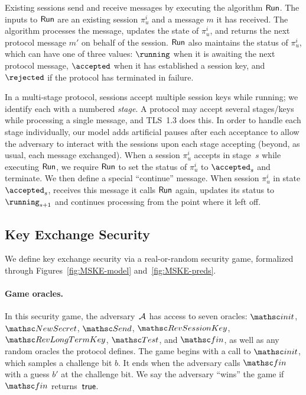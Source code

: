 Existing sessions send and receive messages by executing the algorithm $\mathsf{Run}$.
The inputs to $\mathsf{Run}$ are an existing session $\pi_u^i$ and a message $m$ it has received. 
The algorithm processes the message, updates the state of $\pi_u^i$, and returns the next protocol message $m'$ on behalf of the session. 
$\mathsf{Run}$ also maintains the status of $\pi_u^i$, which can have one of three values: $\running$ when it is awaiting the next protocol message, $\accepted$ when it has established a session key, and $\rejected$ if the protocol has terminated in failure.

In a multi-stage protocol, sessions accept multiple session keys while running; we identify each with a numbered \emph{stage}.
A protocol may accept several stages/keys while processing a single message, and TLS~1.3 does this.
In order to handle each stage individually, our model adds artificial pauses after each acceptance to allow the adversary to interact with the sessions upon each stage accepting (beyond, as usual, each message exchanged).
When a session $\pi_u^i$ accepts in stage~$s$ while executing $\mathsf{Run}$, we require $\mathsf{Run}$ to set the status of $\pi_u^i$ to $\accepted_{s}$ and terminate.
We then define a special ``continue'' message. 
When session $\pi_u^i$ in state $\accepted_{s}$, receives this message it calls $\mathsf{Run}$ again, updates its status to $\running_{s+1}$ and continues processing from the point where it left off.


\subsection{Key Exchange Security}

We define key exchange security via a real-or-random security game, 
	formalized through Figures~\ref{fig:MSKE-model} and~\ref{fig:MSKE-preds}.

\paragraph{Game oracles.}
In this security game, the adversary~$\mathcal{A}$ has access to seven oracles: $\Initialize$, $\NewSecret$, $\Send$, $\RevSessionKey$, $\RevLongTermKey$, $\Test$, and $\Finalize$, as well as any random oracles the protocol defines.
The game begins with a call to $\Initialize$, which samples a challenge bit $b$. 
It ends when the adversary calls $\Finalize$ with a guess $b'$ at the challenge bit.
We say the adversary ``wins'' the game if $\Finalize$ returns~$\mathsf{true}$.

